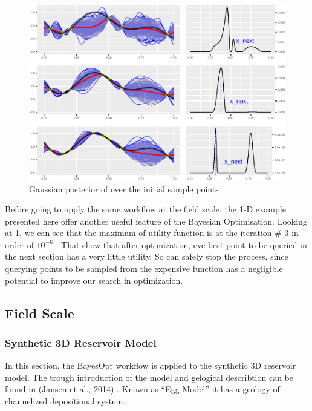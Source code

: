 \documentclass[]{elsarticle} %
\begin{document}
\begin{figure}

\includegraphics[width=0.9\linewidth,height=0.9\textheight]{0_Paper1_main_files/figure-latex/allinone-1} \hfill{}

\caption{Gaussian posterior of over the initial sample points}\label{fig:allinone}
\end{figure}

Before going to apply the same workflow at the field scale, the 1-D example presented here offer another useful feature of the Bayesian Optimisation. Looking at \ref{fig:allinone}, we can see that the maximum of utility function is at the iteration \# 3 in order of \(10^{-6}\) . That show that after optimization, eve best point to be queried in the next section has a very little utility. So can safely stop the process, since querying points to be sampled from the expensive function has a negligible potential to improve our search in optimization.

\newpage

\hypertarget{field-scale}{%
\subsection{Field Scale}\label{field-scale}}

\hypertarget{synthetic-3d-reservoir-model}{%
\subsubsection{Synthetic 3D Reservoir Model}\label{synthetic-3d-reservoir-model}}

In this section, the BayesOpt workflow is applied to the synthetic 3D reservoir model. The trough introduction of the model and gelogical describtion can be found in (Jansen et al., 2014) . Known as ``Egg Model'' it has a geology of channelized depositional system.
\end{document}
